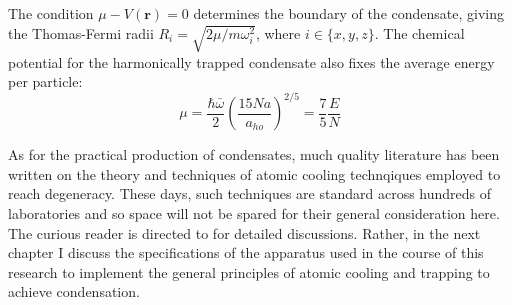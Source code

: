 
	The condition $\mu-V(\textbf{r})=0$ determines the boundary of the condensate, giving the Thomas-Fermi radii $R_i = \sqrt{2\mu/m \omega_i^2}$, where $i\in\{x,y,z\}$. The chemical potential for the harmonically trapped condensate also fixes the average energy per particle:
	\begin{equation}
		\mu = \frac{\hbar\bar{\omega}}{2}\left(\frac{15 N a}{a_{ho}}\right)^{2/5} = \frac{7}{5}\frac{E}{N}
	\end{equation}

	As for the practical production of condensates, much quality literature has been written on the theory and techniques of atomic cooling technqiques employed to reach degeneracy. These days, such techniques are standard across hundreds of laboratories and so space will not be spared for their general consideration here. The curious reader is directed to \cite{MakingProbingUnderstanding,courtielle01,MetVdS, tychkovThesis} for detailed discussions.  Rather, in the next chapter I discuss the specifications of the apparatus used in the course of this research to implement the general principles of atomic cooling and trapping to achieve condensation.
	




